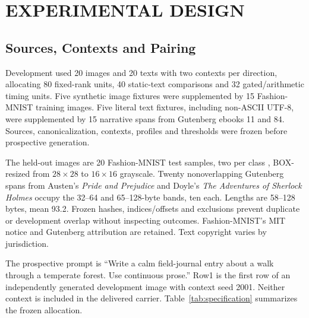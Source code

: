 \section{\uppercase{Experimental Design}}
\label{sec:design}
\subsection{Sources, Contexts and Pairing}
Development used 20 images and 20 texts with two contexts per direction, allocating 80 fixed-rank units, 40 static-text comparisons and 32 gated/arithmetic timing units. Five synthetic image fixtures were supplemented by 15 Fashion-MNIST training images. Five literal text fixtures, including non-ASCII UTF-8, were supplemented by 15 narrative spans from Gutenberg ebooks 11 and 84. Sources, canonicalization, contexts, profiles and thresholds were frozen before prospective generation.\aifootnote

The held-out images are 20 Fashion-MNIST test samples, two per class \cite{fashion}, BOX-resized from $28\times28$ to $16\times16$ grayscale. Twenty nonoverlapping Gutenberg spans from Austen's \emph{Pride and Prejudice} and Doyle's \emph{The Adventures of Sherlock Holmes} occupy the 32--64 and 65--128-byte bands, ten each. Lengths are 58--128 bytes, mean 93.2. Frozen hashes, indices/offsets and exclusions prevent duplicate or development overlap without inspecting outcomes. Fashion-MNIST's MIT notice and Gutenberg attribution are retained. Text copyright varies by jurisdiction.

The prospective prompt is ``Write a calm field-journal entry about a walk through a temperate forest. Use continuous prose.'' Row1 is the first row of an independently generated development image with context seed 2001. Neither context is included in the delivered carrier. Table~\ref{tab:specification} summarizes the frozen allocation.

